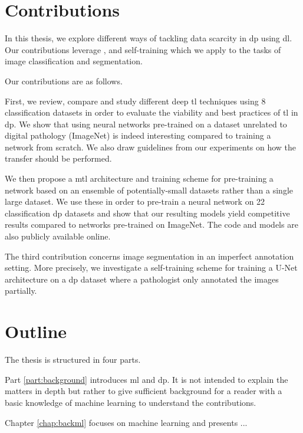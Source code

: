 \section{Contributions}

In this thesis, we explore different ways of tackling data scarcity in \acrlong{dp} using \acrlong{dl}. Our contributions leverage ,  and self-training which we apply to the tasks of image classification and segmentation. 

Our contributions are as follows.

First, we review, compare and study different deep \acrlong{tl} techniques using 8 classification datasets in order to evaluate the viability and best practices of \acrlong{tl} in \acrlong{dp}. We show that using neural networks pre-trained on a dataset unrelated to digital pathology (\ie ImageNet) is indeed interesting compared to training a network from scratch. We also draw guidelines from our experiments on how the transfer should be performed.

We then propose a \acrlong{mtl} architecture and training scheme for pre-training a network based on an ensemble of potentially-small datasets rather than a single large dataset. We use these in order to pre-train a neural network on 22 classification \acrlong{dp} datasets and show that our resulting models yield competitive results compared to networks pre-trained on ImageNet. The code and models are also publicly available online. 

The third contribution concerns image segmentation in an imperfect annotation setting. More precisely, we investigate a self-training scheme for training a U-Net architecture on a \acrshort{dp} dataset where a pathologist only annotated the images partially.



\section{Outline}

The thesis is structured in four parts. 

Part \ref{part:background} introduces \acrlong{ml} and \acrlong{dp}. It is not intended to explain the matters in depth but rather to give sufficient background for a reader with a basic knowledge of machine learning to understand the contributions.

Chapter \ref{chap:backml} focuses on machine learning and presents ... 

